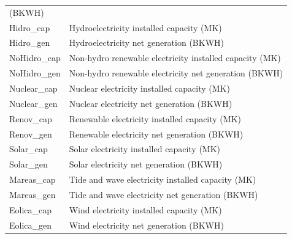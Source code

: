 \documentclass[oneside, openany, fontset=libertinus]{mitthesis}
\newif\ifbibimpresa
\begin{document}
\begin{longtable}[]{@{}
  >{\raggedright\arraybackslash}p{}
  >{\raggedright\arraybackslash}p{}@{}}
(BKWH) \\
Hidro\_cap & Hydroelectricity installed capacity (MK) \\
Hidro\_gen & Hydroelectricity net generation (BKWH) \\
NoHidro\_cap & Non-hydro renewable electricity installed capacity
(MK) \\
NoHidro\_gen & Non-hydro renewable electricity net generation (BKWH) \\
Nuclear\_cap & Nuclear electricity installed capacity (MK) \\
Nuclear\_gen & Nuclear electricity net generation (BKWH) \\
Renov\_cap & Renewable electricity installed capacity (MK) \\
Renov\_gen & Renewable electricity net generation (BKWH) \\
Solar\_cap & Solar electricity installed capacity (MK) \\
Solar\_gen & Solar electricity net generation (BKWH) \\
Mareas\_cap & Tide and wave electricity installed capacity (MK) \\
Mareas\_gen & Tide and wave electricity net generation (BKWH) \\
Eolica\_cap & Wind electricity installed capacity (MK) \\
Eolica\_gen & Wind electricity net generation (BKWH) \\
\end{longtable}

\nocite{ideam-datos, r-core, ggplot2, ggextra}
\ifbibimpresa\else\printbibliography[heading=bibintoc]\fi
\end{document}
